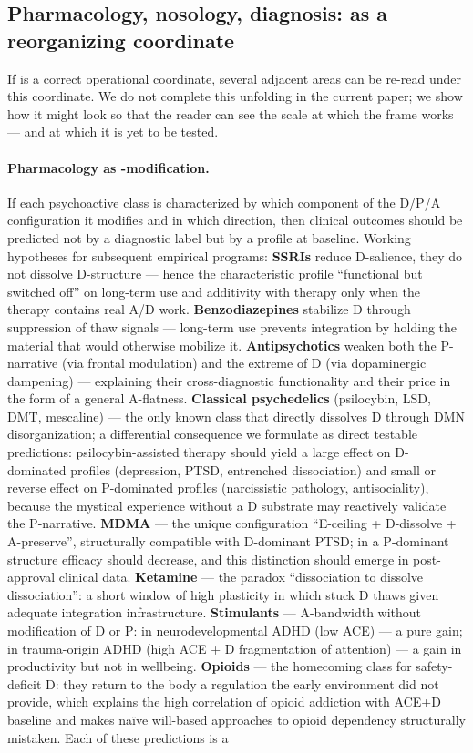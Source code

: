 \subsection{Pharmacology, nosology, diagnosis: \DEIC{} as a reorganizing coordinate}
\label{subsec:pharmacology_nosology}

If \DEIC{} is a correct operational coordinate, several adjacent areas can be re-read under this coordinate. We do not complete this unfolding in the current paper; we show how it might look so that the reader can see the scale at which the frame works --- and at which it is yet to be tested.

\paragraph{Pharmacology as \DEIC{}-modification.} If each psychoactive class is characterized by which component of the D/P/A configuration it modifies and in which direction, then clinical outcomes should be predicted not by a diagnostic label but by a \DEIC{} profile at baseline. Working hypotheses for subsequent empirical programs: \textbf{SSRIs} reduce D-salience, they do not dissolve D-structure --- hence the characteristic profile ``functional but switched off'' on long-term use and additivity with therapy only when the therapy contains real A/D work. \textbf{Benzodiazepines} stabilize D through suppression of thaw signals --- long-term use prevents integration by holding the material that would otherwise mobilize it. \textbf{Antipsychotics} weaken both the P-narrative (via frontal modulation) and the extreme of D (via dopaminergic dampening) --- explaining their cross-diagnostic functionality and their price in the form of a general A-flatness. \textbf{Classical psychedelics} (psilocybin, LSD, DMT, mescaline) --- the only known class that directly dissolves D through DMN disorganization; a differential consequence we formulate as direct testable predictions: psilocybin-assisted therapy should yield a large effect on D-dominated profiles (depression, PTSD, entrenched dissociation) and small or reverse effect on P-dominated profiles (narcissistic pathology, antisociality), because the mystical experience without a D substrate may reactively validate the P-narrative. \textbf{MDMA} --- the unique configuration ``E-ceiling + D-dissolve + A-preserve'', structurally compatible with D-dominant PTSD; in a P-dominant structure efficacy should decrease, and this distinction should emerge in post-approval clinical data. \textbf{Ketamine} --- the paradox ``dissociation to dissolve dissociation'': a short window of high plasticity in which stuck D thaws given adequate integration infrastructure. \textbf{Stimulants} --- A-bandwidth without modification of D or P: in neurodevelopmental ADHD (low ACE) --- a pure gain; in trauma-origin ADHD (high ACE + D fragmentation of attention) --- a gain in productivity but not in wellbeing. \textbf{Opioids} --- the homecoming class for safety-deficit D: they return to the body a regulation the early environment did not provide, which explains the high correlation of opioid addiction with ACE+D baseline and makes naïve will-based approaches to opioid dependency structurally mistaken. Each of these predictions is a 